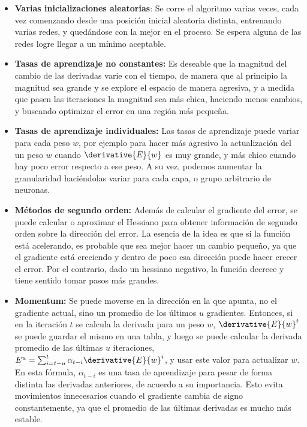 \begin{itemize}
\item \textbf{Varias inicializaciones aleatorias}: Se corre el algoritmo varias veces, cada vez comenzando desde una posición inicial aleatoria distinta, entrenando varias redes, y quedándose con la mejor en el proceso. Se espera alguna de las redes logre llegar a un mínimo aceptable.

\item \textbf{Tasas de aprendizaje no constantes:} Es deseable que la magnitud del cambio de las derivadas varie con el tiempo, de manera que al principio la magnitud sea grande y se explore el espacio de manera agresiva, y a medida que pasen las iteraciones la magnitud sea más chica, haciendo menos cambios, y buscando optimizar el error en una región más pequeña. 

\item \textbf{Tasas de aprendizaje individuales:} Las tasas de aprendizaje puede variar para cada peso $w$, por ejemplo para hacer más agresivo la actualización del un peso $w$ cuando $\derivative{E}{w}$ es muy grande, y más chico cuando hay poco error respecto a ese peso. A su vez, podemos aumentar la granularidad haciéndolas variar para cada capa, o grupo arbitrario de neuronas.

\item \textbf{Métodos de segundo orden:} Además de calcular el gradiente del error, se puede calcular o aproximar el Hessiano para obtener información de segundo orden sobre la dirección del error. La esencia de la idea es que si la función está acelerando, es probable que sea mejor hacer un cambio pequeño, ya que el gradiente está creciendo y dentro de poco esa dirección puede hacer crecer el error. Por el contrario, dado un hessiano negativo, la función decrece y tiene sentido tomar pasos más grandes.

\item \textbf{Momentum:} Se puede moverse en la dirección en la que apunta, no el gradiente actual, sino un promedio de los últimos  $u$ gradientes. Entonces, si en la iteración $t$ se calcula la derivada para un peso $w$, $\derivative{E}{w}^t$ se puede guardar el mismo en una tabla, y luego se puede calcular la derivada promedio de las últimas $u$ iteraciones, $E^u= \sum_{i=t-u}^{t} \alpha_{t-i} \derivative{E}{w}^i$, y usar este valor para actualizar $w$. En esta fórmula, $\alpha_{t-i}$ es una tasa de aprendizaje para pesar de forma distinta las derivadas anteriores, de acuerdo a su importancia. Esto evita movimientos innecesarios cuando el gradiente cambia de signo constantemente, ya que el promedio de las últimas derivadas es mucho más estable.


\end{itemize}
